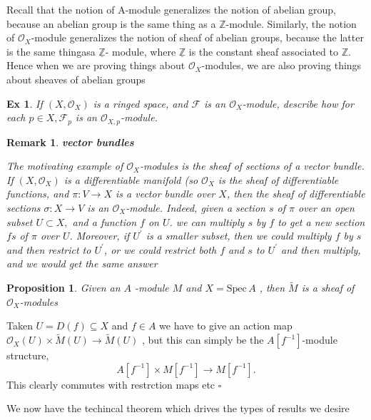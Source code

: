 \documentclass{article}
\newtheorem{proposition}[theorem]{Proposition}
\newtheorem{remark}[theorem]{Remark}
\newtheorem{exercise}[theorem]{Ex}
\newenvironment{Proof}{{\noindent \indent \it Proof:\quad}}{\hfill $\square$\par}
\begin{document}
Recall that the notion of A-module generalizes the notion of abelian group,
because an abelian group is the same thing as a $\mathbb Z$-module. Similarly, the notion of ${\mathcal{O}}_{X}$-module generalizes the notion of sheaf of abelian groups, because the latter is the same thingasa $\underline{\mathbb{Z}}$- module, where $\underline{\mathbb{Z}}$ is the constant sheaf associated to $\mathbb{Z}$. Hence when we are proving things about $\mathcal{O}_{X}$-modules, we are also proving things about sheaves of abelian groups
\begin{exercise}
    If $(X,{\mathcal{O}}_{X})$ is a ringed space, and $\mathcal{F}$ is an ${\mathcal{O}}_{X}$-module, describe how for each $p\in X,{\mathcal{F}}_{p}$ is an ${\mathcal{O}}_{X,p}$-module.
\end{exercise}
\begin{remark}
    \textbf{vector bundles}
    
    The motivating example of ${\mathcal{O}}_{X}$-modules is the sheaf of sections of a vector bundle. If $(X,{\mathcal{O}}_{X})$ is a differentiable manifold (so ${\mathcal{O}}_{X}$ is the sheaf of differentiable functions, and $\pi : V \to X$ is a vector bundle over $X$, then the sheaf of differentiable sections $\sigma\colon X\to V$ is an ${\mathcal{O}}_{X}$-module. Indeed, given a section $s$ of $\pi$ over an open subset $U\subset X,$ and a function $f$ on $U$. we can multiply $s$ by $f$ to get a new section $fs$ of $\pi$ over $U$. Moreover, if $U^\prime$ is a smaller subset, then we could multiply $f$ by $s$ and then restrict to $U^\prime$, or we could restrict both $f$ and $s$ to $U^\prime$ and then multiply, and we would get the same answer
\end{remark}

\begin{proposition}
    Given an $A$ -module $M$ and $X={\mathrm{Spec}}\,A$ , then $\widetilde{{M}}$ is a sheaf of ${\mathcal{O}}_{X}$-modules
\end{proposition}

\begin{Proof}
    Taken $U=D(f)\subseteq X$ and $f\in A$ we have to give an action map ${\mathcal{O}}_{X}(U)\times{\widetilde{M}}(U)\to{\widetilde{M}}(U)$ , but this can simply be the $A[f^{-1}]$-module structure,
$$
A[f^{-1}]\times M[f^{-1}]\longrightarrow M[f^{-1}]. 
$$
This clearly commutes with restrction maps etc
\end{Proof}

We now have the techincal theorem which drives the types of results we desire
\end{document}
